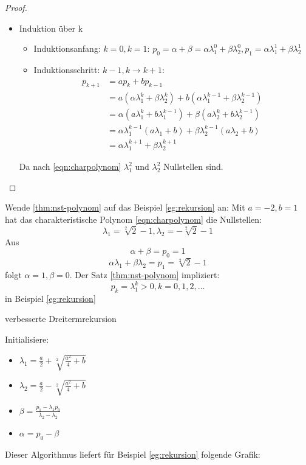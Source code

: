 \begin{proof}
\begin{itemize}
	\item Induktion über k\medskip
\begin{itemize}[label=$\lozenge$, itemsep=2ex]
\item Induktionsanfang: \underline{$k=0,k=1$}: 
	$p_0=\alpha+\beta = \alpha \lambda_1^{0}+\beta \lambda_2^{0}, p_1=\alpha \lambda_1^{1}+\beta \lambda_2^{1}$
\item Induktionsschritt: \underline{$k-1,k \to k+1$}:
	\begin{align*}
	p_{k+1}
	&=ap_k +bp_{k-1} \\
	&= a(\alpha \lambda_1^{k}+ \beta \lambda_2^{k}) + b(\alpha \lambda_1^{k-1}+\beta \lambda_2^{k-1}) \\
	&= \alpha (a \lambda_1^{k}+ b\lambda_1^{k-1})+ \beta (a \lambda_2^{k}+ b \lambda_2^{k-1}) \\
	&= \alpha \lambda_1^{k-1}(a\lambda_1+b) + \beta \lambda_2^{k-1}(a\lambda_2 +b)\\
	&= \alpha \lambda_1^{k+1} + \beta \lambda_2^{k+1}
	\end{align*}
\end{itemize}
Da nach \eqref{eqn:charpolynom} $\lambda_1^2$ und $\lambda_2^2$ Nullstellen sind.
\end{itemize}
\end{proof}
Wende \ref{thm:nst-polynom} auf das Beispiel \ref{eg:rekursion} an: Mit $a=-2, b=1$ hat das charakteristische Polynom \eqref{eqn:charpolynom} die Nullstellen:
\[
\lambda_1= \sqrt[2]{2}-1, \lambda_2= -\sqrt[2]{2}-1 
\]
Aus
\[
\alpha + \beta =p_0 =1
\]
\[
\alpha \lambda_1 + \beta \lambda_2= p_1 = \sqrt[2]{2}-1
\]
folgt $\alpha = 1, \beta = 0$. Der Satz \ref{thm:nst-polynom} impliziert:
\[
p_k= \lambda_1^{k}> 0, k=0,1,2,\ldots
\]
in Beispiel \ref{eg:rekursion}\\
\begin{algorithm}[H]
\label{alg:rekursion}
 \caption{verbesserte Dreitermrekursion}
Initialisiere:
\begin{itemize}
	\item $\lambda_1 = \frac{a}{2}+\sqrt[2]{\frac{a^2}{4}+b}$
	\item $\lambda_2= \frac{a}{2}-\sqrt[2]{\frac{a^2}{4}+b}$
	\item $\beta= \frac{p_1-\lambda_1p_0}{\lambda_2-\lambda_2}$
	\item $\alpha = p_0-\beta$
\end{itemize}
\end{algorithm}
Dieser Algorithmus liefert für Beispiel \ref{eg:rekursion} folgende Grafik:

